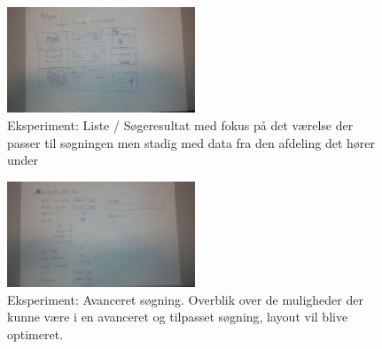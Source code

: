 \documentclass[12pt, a4paper]{report}
\begin{document}
\begin{figure}
\includegraphics[width=0.5\textwidth]{eksperiment_liste}
\caption{Eksperiment: Liste / Søgeresultat med fokus på det værelse der passer til søgningen men stadig med data fra den afdeling det hører under}
\label{e_liste}
\end{figure}

\begin{figure}
\includegraphics[width=0.5\textwidth]{eksperiment_soeg}
\caption{Eksperiment: Avanceret søgning. Overblik over de muligheder der kunne være i en avanceret og tilpasset søgning, layout vil blive optimeret.}
\label{e_soeg}
\end{figure}
\end{document}
